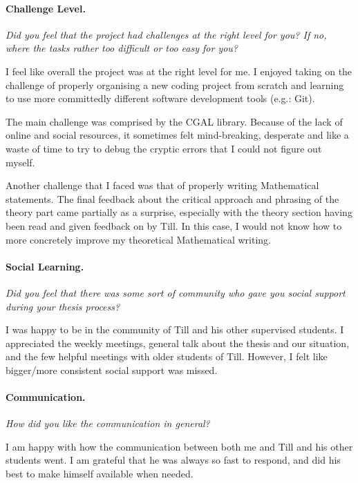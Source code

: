 \documentclass{article}
\begin{document}
\paragraph{Challenge Level.}
\textit{Did you feel that the project had challenges at the right level for you?
If no, where the tasks rather too difficult or too easy for you?}

I feel like overall the project was at the right level for me. I enjoyed taking on the challenge of properly organising a new coding project from scratch and learning to use more committedly different software development tools (e.g.: Git).

The main challenge was comprised by the CGAL library. Because of the lack of online and social resources, it sometimes felt mind-breaking, desperate and like a waste of time to try to debug the cryptic errors that I could not figure out myself.

Another challenge that I faced was that of properly writing Mathematical statements. The final feedback about the critical approach and phrasing of the theory part came partially as a surprise, especially with the theory section having been read and given feedback on by Till. In this case, I would not know how to more concretely improve my theoretical Mathematical writing.



\paragraph{Social Learning.}
\textit{Did you feel that there was some sort of community who gave you social support during your thesis process?}

I was happy to be in the community of Till and his other supervised students. I appreciated the weekly meetings, general talk about the thesis and our situation, and the few helpful meetings with older students of Till. However, I felt like bigger/more consistent social support was missed.


\paragraph{Communication.}
\textit{How did you like the communication in general?}

I am happy with how the communication between both me and Till and his other students went. I am grateful that he was always so fast to respond, and did his best to make himself available when needed.
\end{document}
